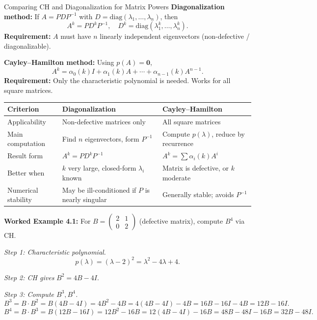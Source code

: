 \documentclass[12pt,a4paper]{article}
\begin{document}
\begin{infobox}{Comparing CH and Diagonalization for Matrix Powers}
\textbf{Diagonalization method:} If \(A = PDP^{-1}\) with \(D = \mathrm{diag}(\lambda_1,\ldots,\lambda_n)\), then
\[
  A^k = P D^k P^{-1}, \quad D^k = \mathrm{diag}(\lambda_1^k, \ldots, \lambda_n^k).
\]
\textbf{Requirement:} \(A\) must have \(n\) linearly independent eigenvectors (non-defective / diagonalizable).

\textbf{Cayley--Hamilton method:} Using \(p(A) = \mathbf{0}\),
\[
  A^k = \alpha_0(k)I + \alpha_1(k)A + \cdots + \alpha_{n-1}(k)A^{n-1}.
\]
\textbf{Requirement:} Only the characteristic polynomial is needed. Works for all square matrices.

\medskip
\begin{center}
\renewcommand{\arraystretch}{1.3}
\begin{tabular}{lll}
\toprule
Criterion & Diagonalization & Cayley--Hamilton \\
\midrule
Applicability & Non-defective matrices only & All square matrices \\
Main computation & Find \(n\) eigenvectors, form \(P^{-1}\) & Compute \(p(\lambda)\), reduce by recurrence \\
Result form & \(A^k = PD^kP^{-1}\) & \(A^k = \sum \alpha_i(k) A^i\) \\
Better when & \(k\) very large, closed-form \(\lambda_i\) known & Matrix is defective, or \(k\) moderate \\
Numerical stability & May be ill-conditioned if \(P\) is nearly singular & Generally stable; avoids \(P^{-1}\) \\
\bottomrule
\end{tabular}
\end{center}
\end{infobox}

\textbf{Worked Example 4.1:} For \(B = \begin{pmatrix} 2 & 1 \\ 0 & 2 \end{pmatrix}\) (defective matrix), compute \(B^4\) via CH.

\textit{Step 1: Characteristic polynomial.}
\[
  p(\lambda) = (\lambda-2)^2 = \lambda^2 - 4\lambda + 4.
\]

\textit{Step 2: CH gives} \(B^2 = 4B - 4I\).

\textit{Step 3: Compute \(B^3, B^4\).}
\[
  B^3 = B \cdot B^2 = B(4B-4I) = 4B^2 - 4B = 4(4B-4I)-4B = 16B-16I-4B = 12B - 16I.
\]
\[
  B^4 = B \cdot B^3 = B(12B-16I) = 12B^2 - 16B = 12(4B-4I)-16B = 48B-48I-16B = 32B - 48I.
\]
\end{document}
